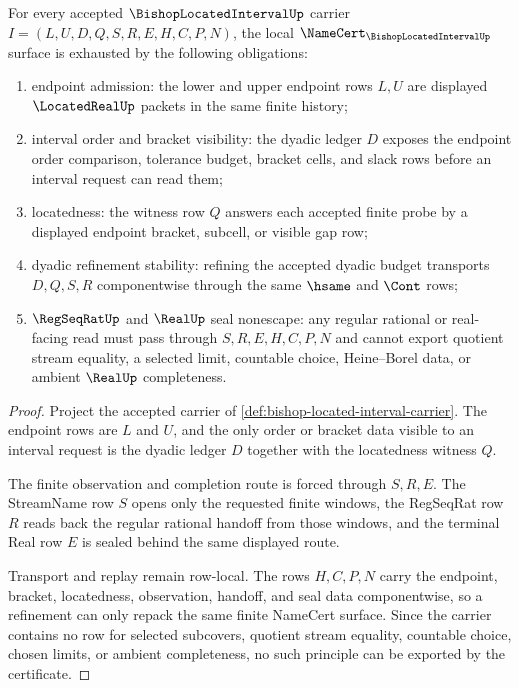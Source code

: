 \begin{theorem}
\label{thm:bishop-located-interval-namecert-obligations}
For every accepted $\BishopLocatedIntervalUp$ carrier $I=(L,U,D,Q,S,R,E,H,C,P,N)$, the local $\NameCert_{\BishopLocatedIntervalUp}$ surface is exhausted by the following obligations:
\begin{enumerate}
\item endpoint admission: the lower and upper endpoint rows $L,U$ are displayed $\LocatedRealUp$ packets in the same finite history;
\item interval order and bracket visibility: the dyadic ledger $D$ exposes the endpoint order comparison, tolerance budget, bracket cells, and slack rows before an interval request can read them;
\item locatedness: the witness row $Q$ answers each accepted finite probe by a displayed endpoint bracket, subcell, or visible gap row;
\item dyadic refinement stability: refining the accepted dyadic budget transports $D,Q,S,R$ componentwise through the same $\hsame$ and $\Cont$ rows;
\item $\RegSeqRatUp$ and $\RealUp$ seal nonescape: any regular rational or real-facing read must pass through $S,R,E,H,C,P,N$ and cannot export quotient stream equality, a selected limit, countable choice, Heine--Borel data, or ambient $\RealUp$ completeness.
\end{enumerate}
\end{theorem}
\begin{proof}
Project the accepted carrier of \autoref{def:bishop-located-interval-carrier}. The endpoint rows are $L$ and $U$, and the only order or bracket data visible to an interval request is the dyadic ledger $D$ together with the locatedness witness $Q$.

The finite observation and completion route is forced through $S,R,E$. The StreamName row $S$ opens only the requested finite windows, the RegSeqRat row $R$ reads back the regular rational handoff from those windows, and the terminal Real row $E$ is sealed behind the same displayed route.

Transport and replay remain row-local. The rows $H,C,P,N$ carry the endpoint, bracket, locatedness, observation, handoff, and seal data componentwise, so a refinement can only repack the same finite NameCert surface. Since the carrier contains no row for selected subcovers, quotient stream equality, countable choice, chosen limits, or ambient completeness, no such principle can be exported by the certificate.
\end{proof}

